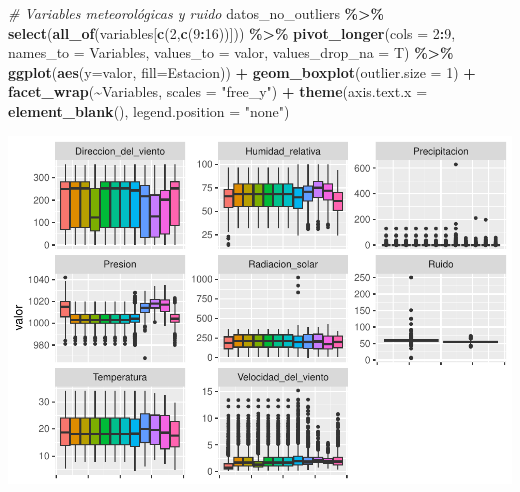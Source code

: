 \documentclass[notspecified,article,submit,moreauthors,pdftex]{Definitions/mdpi}
\newenvironment{Shaded}{\begin{snugshade}}{\end{snugshade}}
\newcommand{\AttributeTok}[1]{\textcolor[rgb]{0.13,0.29,0.53}{#1}}
\newcommand{\CommentTok}[1]{\textcolor[rgb]{0.56,0.35,0.01}{\textit{#1}}}
\newcommand{\DecValTok}[1]{\textcolor[rgb]{0.00,0.00,0.81}{#1}}
\newcommand{\FunctionTok}[1]{\textcolor[rgb]{0.13,0.29,0.53}{\textbf{#1}}}
\newcommand{\NormalTok}[1]{#1}
\newcommand{\SpecialCharTok}[1]{\textcolor[rgb]{0.81,0.36,0.00}{\textbf{#1}}}
\newcommand{\StringTok}[1]{\textcolor[rgb]{0.31,0.60,0.02}{#1}}
\begin{document}
\begin{Shaded}
\begin{Highlighting}[]
\CommentTok{\# Variables meteorológicas y ruido}
\NormalTok{datos\_no\_outliers }\SpecialCharTok{\%\textgreater{}\%}
  \FunctionTok{select}\NormalTok{(}\FunctionTok{all\_of}\NormalTok{(variables[}\FunctionTok{c}\NormalTok{(}\DecValTok{2}\NormalTok{,}\FunctionTok{c}\NormalTok{(}\DecValTok{9}\SpecialCharTok{:}\DecValTok{16}\NormalTok{))])) }\SpecialCharTok{\%\textgreater{}\%}
  \FunctionTok{pivot\_longer}\NormalTok{(}\AttributeTok{cols =} \DecValTok{2}\SpecialCharTok{:}\DecValTok{9}\NormalTok{, }\AttributeTok{names\_to =} \StringTok{\textquotesingle{}Variables\textquotesingle{}}\NormalTok{, }\AttributeTok{values\_to =} \StringTok{\textquotesingle{}valor\textquotesingle{}}\NormalTok{, }\AttributeTok{values\_drop\_na =}\NormalTok{ T) }\SpecialCharTok{\%\textgreater{}\%}
  \FunctionTok{ggplot}\NormalTok{(}\FunctionTok{aes}\NormalTok{(}\AttributeTok{y=}\NormalTok{valor, }\AttributeTok{fill=}\NormalTok{Estacion)) }\SpecialCharTok{+} 
  \FunctionTok{geom\_boxplot}\NormalTok{(}\AttributeTok{outlier.size =} \DecValTok{1}\NormalTok{) }\SpecialCharTok{+}
  \FunctionTok{facet\_wrap}\NormalTok{(}\SpecialCharTok{\textasciitilde{}}\NormalTok{Variables, }\AttributeTok{scales =} \StringTok{"free\_y"}\NormalTok{) }\SpecialCharTok{+} 
  \FunctionTok{theme}\NormalTok{(}\AttributeTok{axis.text.x =} \FunctionTok{element\_blank}\NormalTok{(), }\AttributeTok{legend.position =} \StringTok{"none"}\NormalTok{)}
\end{Highlighting}
\end{Shaded}

\includegraphics{ProyectoAED2023_plantilla_files/figure-latex/unnamed-chunk-20-1.pdf}
\end{document}
